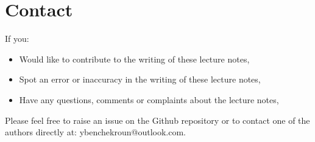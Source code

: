 \documentclass[main]{subfiles}
\begin{document}
\section*{Contact}
If you:
\begin{itemize}
    \item Would like to contribute to the writing of these lecture notes,
    \item Spot an error or inaccuracy in the writing of these lecture notes,
    \item Have any questions, comments or complaints about the lecture notes,
\end{itemize}
Please feel free to raise an issue on the Github repository or to contact one of the authors directly at: ybenchekroun@outlook.com. 
\end{document}
